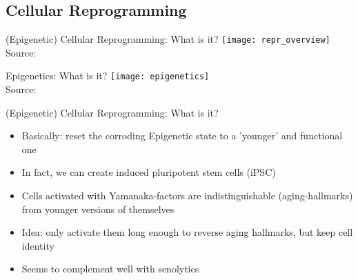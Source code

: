 \subsection{Cellular Reprogramming}

\begin{frame}[c]{(Epigenetic) Cellular Reprogramming: What is it?} 
    \texttt{[image: repr\_overview]} \\
    Source: \cite{ocampo2016vivo}
\end{frame}


\begin{frame}[c]{Epigenetics: What is it?}
    \texttt{[image: epigenetics]} \\
    Source: \cite{hollbacher2020seq}
\end{frame}

\begin{frame}[c]{(Epigenetic) Cellular Reprogramming: What is it?}
    \large
    \begin{itemize}[<+(1)->]
        \item Basically: reset the corroding Epigenetic state to a 'younger' and functional one
        \item In fact, we can create induced pluripotent stem cells (iPSC) \cite{takahashi2006induction}
        \item Cells activated with Yamanaka-factors are indistinguishable (aging-hallmarks) from younger versions of themselves
        \item Idea: only activate them long enough to reverse aging hallmarks, but keep cell identity
        \item Seems to complement well with senolytics \cite{ofenbauer2019strategies}
    \end{itemize}
\end{frame}

